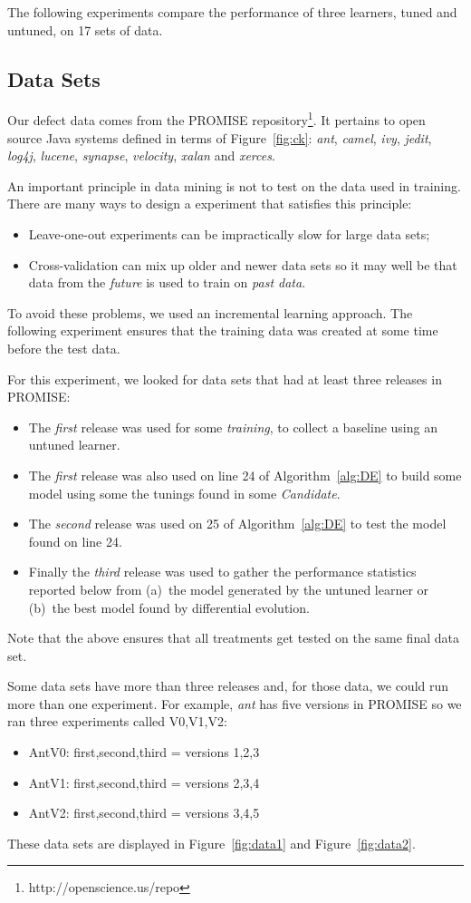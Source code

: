 \documentclass{sig-alternative}
\newcommand{\bi}{\begin{itemize}[leftmargin=0.4cm]}
\newcommand{\ei}{\end{itemize}}
\newcommand{\fig}[1]{Figure~\ref{fig:#1}}
\begin{document}
The following experiments compare the performance of three learners, tuned and untuned, on 17
sets of data. 

\subsection{Data Sets}

Our defect data comes from the PROMISE repository\footnote{http://openscience.us/repo}.
It pertains to 
open source Java systems defined in terms of \fig{ck}:  {\it ant}, {\it camel}, {\it ivy}, {\it jedit}, {\it log4j}, {\it lucene}, {\it 
synapse}, {\it velocity}, {\it xalan} and {\it xerces}. 

An important principle in data mining is not to test on the data used
in training.  There are many ways to design a experiment that satisfies this principle:
\bi
\item  Leave-one-out experiments can be impractically slow for large data sets;
\item Cross-validation can mix up older and newer data sets so it may well be that
data from the {\em future} is used to train on {\em past data}.
\ei
To avoid these problems, we used an incremental learning approach. The following
experiment ensures that the training data was created at some time before the test
data.

For this experiment, we looked for data sets that had at least three  
releases in PROMISE:
\bi 
\item The {\em first} release was used for some  {\em training}, to collect a baseline
   using an untuned learner.
   \item
   The {\em first} release was also used  on line 24 of Algorithm~\ref{alg:DE} to
   build some model using some the tunings found in some {\em Candidate}.
   \item The {\em second} release was used on 25 of Algorithm~\ref{alg:DE} to 
   test the model found on line 24.
   \item Finally the {\em third} release was used to gather the performance statistics
   reported below from (a)~the model generated by the untuned learner or (b)~the
   best model found by differential evolution.
   
   \ei
 Note that the above ensures that all treatments get tested on the same final data set.
 
 Some data sets have more than three releases and, for those data, we could run more
 than one experiment. For example, {\em ant} has five versions in PROMISE so
 we ran three experiments called V0,V1,V2:
 \bi
 \item AntV0: first,second,third = versions 1,2,3
 \item AntV1: first,second,third = versions 2,3,4
 \item AntV2: first,second,third = versions 3,4,5
 \ei 
These data sets are displayed in \fig{data1} and \fig{data2}.
\end{document}
